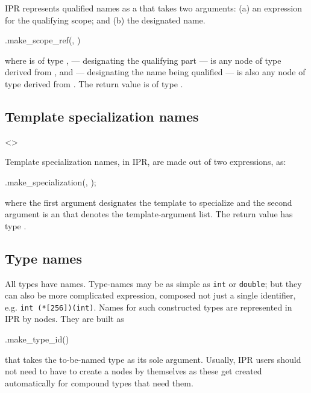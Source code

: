 \documentclass[a4paper,12pt]{article}
\begin{document}
IPR represents qualified names as a  that takes two
arguments: (a) an expression for the qualifying scope;
and (b) the designated name.
\begin{Program}
  .make_scope_ref(, )
\end{Program}
where  is of type ,  --- designating
the qualifying part --- is any node of type derived from , and
 --- designating the name being qualified --- is also any node of
type derived from .  The return value is of type 
.

\subsection{Template specialization names}
\label{sec:name.specialization}
\begin{Grammar}
      <>
\end{Grammar}

Template specialization names,  in IPR, are made out
of two expressions, as:
\begin{Program}
  .make_specialization(, );
\end{Program}
where the first argument designates the template to specialize and the second
argument is an  that denotes the template-argument
list.  The return value has type . 

\subsection{Type names}
\label{sec:name.type-id}

All types have names.  Type-names may be as simple as \texttt{int} or
\texttt{double}; but they can also be more complicated expression, composed
not just a single identifier, e.g. \texttt{int (*[256])(int)}.  Names for such
constructed types are represented in IPR by  nodes.  They
are built as
\begin{Program}
  .make_type_id()
\end{Program}
that takes the to-be-named type as its sole argument.  Usually, IPR users
should not need to have to create a  nodes by themselves
as these get created automatically for compound types that need them.
\end{document}
